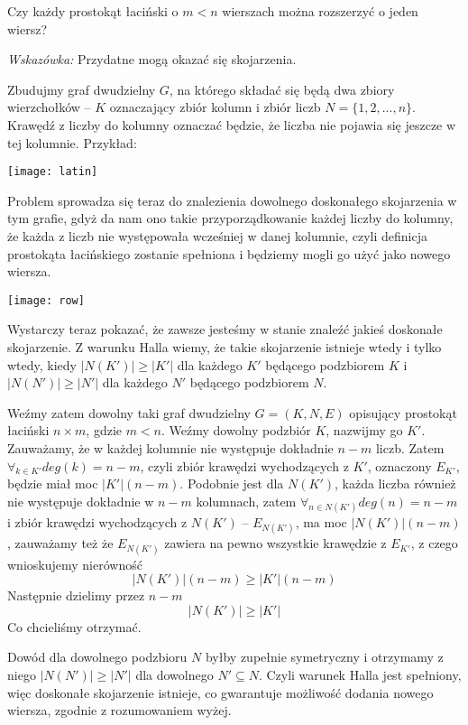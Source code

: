 \documentclass[12pt,a4paper]{article}
\begin{document}
\noindent
Czy każdy prostokąt łaciński o \(m < n\) wierszach można rozszerzyć o jeden wiersz?

\noindent
\textit{Wskazówka:} Przydatne mogą okazać się skojarzenia.
\vskip 0.2cm

Zbudujmy graf dwudzielny \(G\), na którego składać się będą dwa zbiory wierzchołków -- \(K\) oznaczający zbiór kolumn i zbiór liczb \( N = \{ 1,2,...,n \} \). Krawędź z liczby do kolumny oznaczać będzie, że liczba nie pojawia się jeszcze w tej kolumnie. Przykład:

\begin{center}
	\texttt{[image: latin]}
\end{center}

Problem sprowadza się teraz do znalezienia dowolnego doskonałego skojarzenia w tym grafie, gdyż da nam ono takie przyporządkowanie każdej liczby do kolumny, że każda z liczb nie występowała wcześniej w danej kolumnie, czyli definicja prostokąta łacińskiego zostanie spełniona i będziemy mogli go użyć jako nowego wiersza.

\begin{center}
	\texttt{[image: row]}
\end{center}

Wystarczy teraz pokazać, że zawsze jesteśmy w stanie znaleźć jakieś doskonałe skojarzenie. Z warunku Halla wiemy, że takie skojarzenie istnieje wtedy i tylko wtedy, kiedy \( |N(K')| \geq |K'| \) dla każdego \(K'\) będącego podzbiorem \(K\) i \( |N(N')| \geq |N'| \) dla każdego \(N'\) będącego podzbiorem \(N\).

Weźmy zatem dowolny taki graf dwudzielny \(G = (K,N,E)\) opisujący prostokąt łaciński \(n \times m\), gdzie \(m < n\). Weźmy dowolny podzbiór \(K\), nazwijmy go \(K'\). Zauważamy, że w każdej kolumnie nie występuje dokładnie \(n-m\) liczb. Zatem \(\forall_{k \in K'} deg(k)=n-m \), czyli zbiór krawędzi wychodzących z \(K'\), oznaczony \(E_{K'}\), będzie miał moc \( |K'|(n-m) \). Podobnie jest dla \(N(K')\), każda liczba również nie występuje dokładnie w \(n-m\) kolumnach, zatem \(\forall_{n \in N(K')} deg(n)=n-m \) i zbiór krawędzi wychodzących z \(N(K')\) -- \(E_{N(K')}\), ma moc \( |N(K')|(n-m) \), zauważamy też że \(E_{N(K')}\) zawiera na pewno wszystkie krawędzie z \(E_{K'}\), z czego wnioskujemy nierówność
\[
	|N(K')|(n-m) \geq |K'|(n-m)
\]
Następnie dzielimy przez \(n-m\)
\[
	|N(K')| \geq |K'|
\]
Co chcieliśmy otrzymać.

Dowód dla dowolnego podzbioru \(N\) byłby zupełnie symetryczny i otrzymamy z niego \(
	|N(N')| \geq |N'|
\) dla dowolnego \(N' \subseteq N\). Czyli warunek Halla jest spełniony, więc doskonałe skojarzenie istnieje, co gwarantuje możliwość dodania nowego wiersza, zgodnie z rozumowaniem wyżej.
\end{document}
